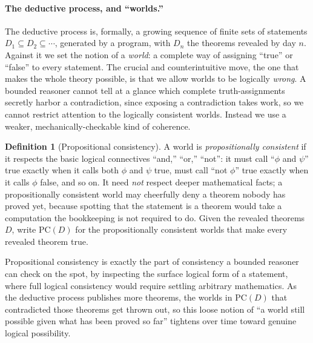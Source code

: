 \documentclass[10pt]{article}
\theoremstyle{definition}
\newtheorem{definition}[theorem]{Definition}
\theoremstyle{remark}
\newcommand{\PC}{\mathrm{PC}}
\begin{document}
\paragraph{The deductive process, and ``worlds.''} The deductive process is, formally, a growing sequence of finite sets of statements $D_1 \subseteq D_2 \subseteq \cdots$, generated by a program, with $D_n$ the theorems revealed by day $n$. Against it we set the notion of a \emph{world}: a complete way of assigning ``true'' or ``false'' to every statement. The crucial and counterintuitive move, the one that makes the whole theory possible, is that we allow worlds to be logically \emph{wrong}. A bounded reasoner cannot tell at a glance which complete truth-assignments secretly harbor a contradiction, since exposing a contradiction takes work, so we cannot restrict attention to the logically consistent worlds. Instead we use a weaker, mechanically-checkable kind of coherence.

\begin{definition}[Propositional consistency]
\label{def:pc}
A world is \emph{propositionally consistent} if it respects the basic logical connectives ``and,'' ``or,'' ``not'': it must call ``$\phi$ and $\psi$'' true exactly when it calls both $\phi$ and $\psi$ true, must call ``not $\phi$'' true exactly when it calls $\phi$ false, and so on. It need \emph{not} respect deeper mathematical facts; a propositionally consistent world may cheerfully deny a theorem nobody has proved yet, because spotting that the statement is a theorem would take a computation the bookkeeping is not required to do. Given the revealed theorems $D$, write $\PC(D)$ for the propositionally consistent worlds that make every revealed theorem true.
\end{definition}

Propositional consistency is exactly the part of consistency a bounded reasoner can check on the spot, by inspecting the surface logical form of a statement, where full logical consistency would require settling arbitrary mathematics. As the deductive process publishes more theorems, the worlds in $\PC(D)$ that contradicted those theorems get thrown out, so this loose notion of ``a world still possible given what has been proved so far'' tightens over time toward genuine logical possibility.
\end{document}

